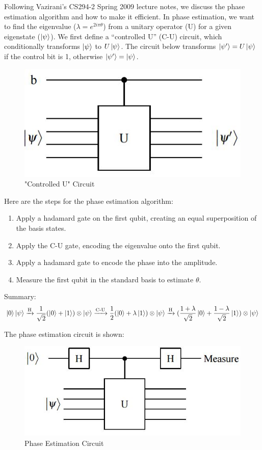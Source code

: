 \documentclass[11pt]{journal}
\begin{document}
Following Vazirani's CS294-2 Spring 2009 lecture notes\cite{vaz}, we discuss the phase estimation algorithm and how to make it efficient. In phase estimation, we want to find the eigenvalue ($\lambda=e^{2i\pi\theta}$) from a unitary operator (U) for a given eigenstate ($\ket{\psi}$). We first define a “controlled U” (C-U) circuit, which conditionally transforms $\ket{\psi}$ to $U\ket{\psi}$. The circuit below transforms $\ket{\psi'} = U\ket{\psi}$ if the control bit is 1, otherwise $\ket{\psi'} = \ket{\psi}$.
\begin{figure}[H]
    \centering
    \includegraphics[scale = 0.6]{2.JPG}
    \caption{"Controlled U" Circuit}
    \label{fig:my_label}
\end{figure}
Here are the steps for the phase estimation algorithm:
\begin{enumerate}
    \item Apply a hadamard gate on the first qubit, creating an equal superposition of the basis states.
    
    \item Apply the C-U gate, encoding the eigenvalue onto the first qubit.
    
    \item Apply a hadamard gate to encode the phase into the amplitude.
    
    \item Measure the first qubit in the standard basis to estimate $\theta$.
\end{enumerate}

Summary:
\[\ket{0}\ket{\psi} \xrightarrow{\text{H}} \frac{1}{\sqrt{2}}(\ket{0} + \ket{1})\otimes\ket{\psi}\xrightarrow{\text{C-U}} \frac{1}{2}(\ket{0} + \lambda\ket{1})\otimes\ket{\psi}\xrightarrow{\text{H}}(\frac{1+\lambda}{\sqrt{2}}\ket{0} + \frac{1-\lambda}{\sqrt{2}}\ket{1})\otimes\ket{\psi}\]

The phase estimation circuit is shown:

\begin{figure}[H]
    \centering
    \includegraphics[scale = 0.6]{3.JPG}
    \caption{Phase Estimation Circuit}
    \label{fig:my_label}
\end{figure}
\end{document}
